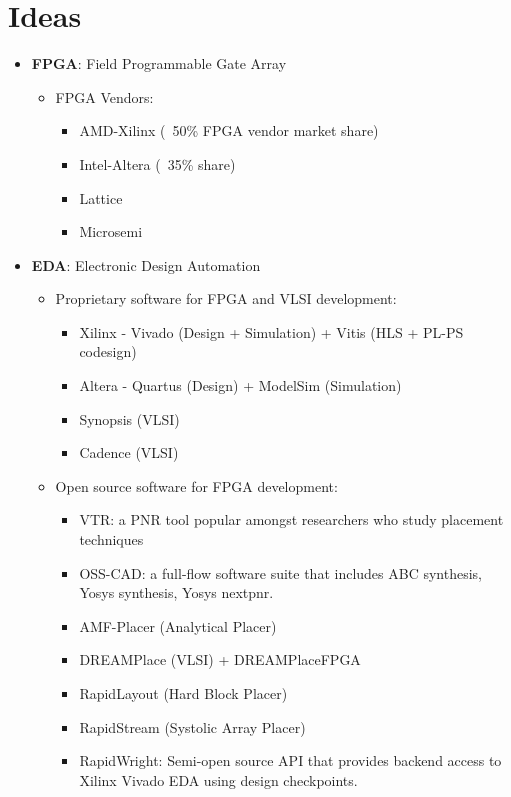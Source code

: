 \documentclass{article}
\begin{document}
\section{Ideas}
\begin{itemize}[label={\textbullet}, left=0.25cm]
    \item \textbf{FPGA}: Field Programmable Gate Array
    \begin{itemize}[label={--}, left=0.25cm]
        \item FPGA Vendors:
        \begin{itemize}[label={$\cdot$}, left=0.25cm]
            \item AMD-Xilinx (~50\% FPGA vendor market share)
            \item Intel-Altera (~35\% share)
            \item Lattice
            \item Microsemi
        \end{itemize}
    \end{itemize}

    \item \textbf{EDA}: Electronic Design Automation
    \begin{itemize}[label={--}, left=0.25cm]
        \item Proprietary software for FPGA and VLSI development:
        \begin{itemize}[label={$\cdot$}, left=0.25cm]
            \item Xilinx - Vivado (Design + Simulation) + Vitis (HLS + PL-PS codesign)
            \item Altera - Quartus (Design) + ModelSim (Simulation)
            \item Synopsis (VLSI)
            \item Cadence (VLSI)
        \end{itemize}
        \item Open source software for FPGA development:
        \begin{itemize}[label={$\cdot$}, left=0.25cm]
            \item VTR: a PNR tool popular amongst researchers who study placement techniques
            \item OSS-CAD: a full-flow software suite that includes ABC synthesis, Yosys synthesis, Yosys nextpnr.
            \item AMF-Placer (Analytical Placer)
            \item DREAMPlace (VLSI) + DREAMPlaceFPGA
            \item RapidLayout (Hard Block Placer)
            \item RapidStream (Systolic Array Placer)
            \item RapidWright: Semi-open source API that provides backend access to Xilinx Vivado EDA using design checkpoints.
            

\end{itemize}
\end{itemize}
\end{itemize}
\end{document}
